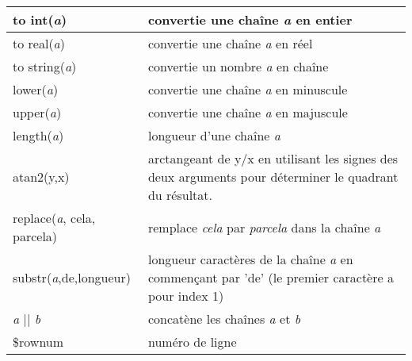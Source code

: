 \begin{center}
{\begin{longtable}{|p{4cm}|p{10cm}|}
\hline to int(\textit{a}) & convertie une chaîne \textit{a} en entier \\
\hline to real(\textit{a}) & convertie une chaîne \textit{a} en réel \\
\hline to string(\textit{a}) & convertie un nombre \textit{a} en chaîne \\
\hline lower(\textit{a}) & convertie une chaîne \textit{a} en minuscule \\
\hline upper(\textit{a}) & convertie une chaîne \textit{a} en majuscule \\
\hline length(\textit{a}) & longueur d'une chaîne \textit{a} \\
\hline atan2(y,x) & arctangeant de y/x en utilisant les signes des deux arguments 
pour déterminer le quadrant du résultat. \\
\hline replace(\textit{a}, cela, parcela) & remplace \textit{cela} par 
\textit{parcela} dans la chaîne \textit{a} \\
\hline substr(\textit{a},de,longueur) & longueur caractères de la chaîne \textit{a} 
en commençant par 'de' (le premier caractère a pour index 1) \\
\hline \textit{a} || \textit{b} & concatène les chaînes \textit{a} et \textit{b} \\
\hline \$rownum & numéro de ligne \\

\end{longtable}}
\end{center}
